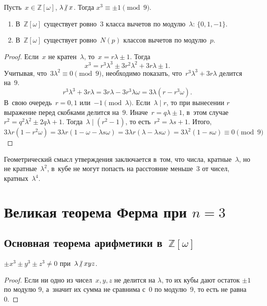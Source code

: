 \documentclass{article}
\begin{document}
\begin{claim}
  Пусть~$x \in \mathbb{Z}[\omega]$, $\lambda \ndiv x$. Тогда $x^3 \equiv \pm 1
  \pmod 9$.
\end{claim}
\begin{exercise}
  \leavevmode
  \begin{enumerate}[label=(\arabic*)]
    \item
      В~$\mathbb{Z}[\omega]$ существует ровно~$3$ класса вычетов по
      модулю~$\lambda$: $\{0, 1, -1\}$.
    \item
      В~$\mathbb{Z}[\omega]$ существует ровно~$N(p)$ классов вычетов по
      модулю~$p$.
  \end{enumerate}
\end{exercise}
\begin{proof}
  Если~$x$ не кратен~$\lambda$, то~$x = r\lambda \pm 1$. Тогда
  $$x^3 = r^3 \lambda^3 \pm 3 r^2 \lambda^2 + 3r\lambda \pm 1.$$
  Учитывая, что~$3\lambda^2 \equiv 0 \pmod 9$, необходимо показать,
  что~$r^3\lambda^3 + 3r\lambda$ делится на~$9$.
  $$r^3\lambda^3 + 3r\lambda = 3r\lambda - 3r^3\lambda\omega =
  3\lambda (r - r^3 \omega).$$
  В~свою очередь~$r = 0, 1$ или~$-1 \pmod \lambda$. Если~$\lambda \mid r$,
  то при вынесении $r$ выражение перед скобками делится на~$9$.
  Иначе~$r = q\lambda \pm 1$, в~этом случае~$r^2 = q^2 \lambda^2 \pm 2 q\lambda
  + 1$. Тогда~$\lambda \mid (r^2 - 1)$, то есть~$r^2 = \lambda s + 1$. Итого,
  $$3\lambda r(1 - r^2\omega) = 3\lambda r(1 - \omega - \lambda s \omega) =
  3\lambda r(\lambda - \lambda s \omega) = 3\lambda^2 (1 - s\omega)
  \equiv 0 \pmod 9$$
\end{proof}
\begin{remark}
  Геометрический смысл утверждения заключается в~том, что числа,
  кратные~$\lambda$, но не кратные~$\lambda^2$, в~кубе не могут попасть на
  расстояние меньше~$3$ от чисел, кратных~$\lambda^4$.
\end{remark}

\section{Великая теорема Ферма при $n = 3$}

\subsection{Основная теорема арифметики в~$\mathbb{Z}[\omega]$}

\begin{claim}
  $\pm x^3 \pm y^3 \pm z^3 \ne 0$ при~$\lambda \ndiv xyz$.
\end{claim}
\begin{proof}
  Если ни одно из чисел~$x, y, z$ не делится на $\lambda$, то их кубы дают
  остаток $\pm 1$ по модулю $9$, а~значит их сумма не сравнима с~$0$ по
  модулю~$9$, то есть не равна~$0$.
\end{proof}
\end{document}
